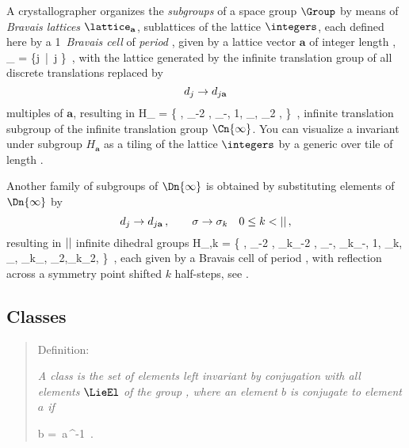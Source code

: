 A crystallographer organizes the \emph{subgroups} of a space group
$\Group$ by means of \emph{Bravais lattices} $\lattice_\mathbf{a}$,
sublattices of the lattice $\integers$, each defined here by a 1\dmn\
\emph{Bravais cell} of \emph{period} \cl{}, given by a lattice vector
$\mathbf{a}$ of integer length \cl{},
\beq
\lattice_ = \{j  \,|\, j \in \integers\}
\,,
with the lattice generated by the infinite translation group of all
discrete translations replaced by
\[
  d_{j}\to d_{j\mathbf{a}}
\]
multiples of $\mathbf{a}$, resulting in
\beq
H_{} = \{ \cdots, \shift_{-2 }, \shift_{-},
1, \shift_{\mathbf{a}}, \shift_{2 \mathbf{a}}, \cdots\}
\,,
infinite translation subgroup of the infinite translation group
$\Cn{\infty}$. You can visualize a {\lattstate} invariant under subgroup
$H_{\mathbf{a}}$ as a tiling of the lattice $\integers$ by a generic
{\lattstate} over tile of length \cl{}.

Another family of subgroups of
$\Dn{\infty}$ is obtained
by substituting elements of $\Dn{\infty}$  by
\[
  d_{j}\to d_{j\mathbf{a}}
\,,\qquad
    \sigma\to \sigma_{k}
  \quad
     0\leq{k}<{||}
\,,
\]
resulting in ${||}$ infinite dihedral groups
\beq
H_{,k} = \{
\cdots, \shift_{-2 }, \Refl_{k}\shift_{-2 },
        \shift_{-\mathbf{a}}, \Refl_{k}\shift_{-},
        1,                    \Refl_{k},
        \shift_{},  \Refl_{k}\shift_{},
        \shift_{2\mathbf{a}},\Refl_{k}\shift_{2\mathbf{a}}, \cdots
             \}
\,,
each given by a {Bravais cell} of period \cl{}, with reflection
across a symmetry point shifted $k$ half-steps, see
.


\subsection{Classes}
\label{s:1dLattClass}

    \begin{quote}
Definition:
{\em A class is the set of elements left
invariant by conjugation with all elements $\LieEl$ of the group \Group,
where an element $b$ is \emph{conjugate} to element $a$ {if}

}
\beq
b = \LieEl\,a\,\LieEl^{-1}
\,.
    \end{quote}



